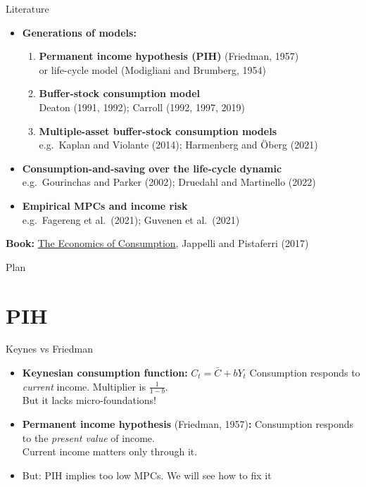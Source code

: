 \documentclass[
  10pt,
  ignorenonframetext,
  aspectratio=43,
  english,
]{beamer}
\providecommand{\tightlist}{%
  \setlength{\itemsep}{0pt}\setlength{\parskip}{0pt}}
\begin{document}
\begin{frame}{Literature}
\protect{}\label{literature}
\begin{itemize}
\tightlist
\item
  \textbf{Generations of models:}

  \begin{enumerate}
  \tightlist
  \item
    \textbf{Permanent income hypothesis (PIH)} (Friedman, 1957)\\
    or life-cycle model (Modigliani and Brumberg, 1954)
  \item
    \textbf{Buffer-stock consumption model}\\
    Deaton (1991, 1992); Carroll (1992, 1997, 2019)
  \item
    \textbf{Multiple-asset buffer-stock consumption models}\\
    e.g.~Kaplan and Violante (2014); Harmenberg and Öberg (2021)
  \end{enumerate}
\item
  \textbf{Consumption-and-saving over the life-cycle dynamic}\\
  e.g.~Gourinchas and Parker (2002); Druedahl and Martinello (2022)
\item
  \textbf{Empirical MPCs and income risk}\\
  e.g.~Fagereng et al.~(2021); Guvenen et al.~(2021)
\end{itemize}

\textbf{Book:}
\href{https://global.oup.com/academic/product/the-economics-of-consumption-9780199383153?cc=dk&lang=en&}{The
Economics of Consumption}, Jappelli and Pistaferri (2017)
\end{frame}

\begin{frame}{Plan}
\protect{}\label{plan}
\tableofcontents[]
\end{frame}

\section{PIH}\label{pih}

\begin{frame}{Keynes vs Friedman}
\protect{}\label{keynes-vs-friedman}
\begin{itemize}
\tightlist
\item
  \textbf{Keynesian consumption function:} \(C_{t}=\bar{C}+bY_{t}\)
  Consumption responds to \emph{current} income. Multiplier is
  \(\frac{1}{1-b}\).\\
  But it lacks micro-foundations!
\item
  \textbf{Permanent income hypothesis} (Friedman, 1957)\textbf{:}
  Consumption responds to the \emph{present value} of income.\\
  Current income matters only through it.
\item
  But: PIH implies too low MPCs. We will see how to fix it
\end{itemize}
\end{frame}
\end{document}
